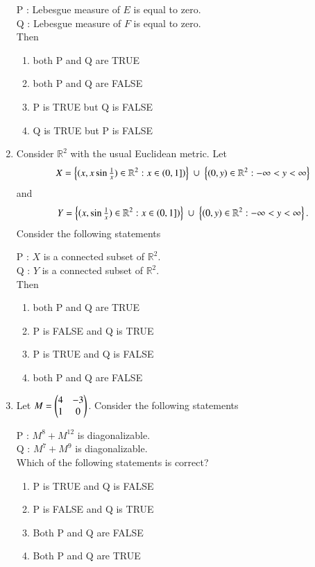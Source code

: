 \documentclass[journal,12pt,onecolumn]{IEEEtran}
\theoremstyle{remark}
\begin{document}
\begin{enumerate}[start=1, label=Q.\arabic*]
P : Lebesgue measure of $E$ is equal to zero.\\
Q : Lebesgue measure of $F$ is equal to zero.\\

Then
\begin{enumerate}
\item both P and Q are TRUE
\item both P and Q are FALSE
\item P is TRUE but Q is FALSE
\item Q is TRUE but P is FALSE
\end{enumerate}

\hfill{}

\item Consider $\mathbb{R}^{2}$ with the usual Euclidean metric. Let
\[
X=\left\{(x, x\sin \tfrac{1}{x}) \in \mathbb{R}^{2} : x \in \left(0,1]\right)\right\}\ \cup\ \left\{(0,y) \in \mathbb{R}^{2} : -\infty<y<\infty\right\}
\]
and
\[
Y=\left\{(x, \sin \tfrac{1}{x}) \in \mathbb{R}^{2} : x \in \left(0,1]\right)\right\}\ \cup\ \left\{(0,y) \in \mathbb{R}^{2} : -\infty<y<\infty\right\}.
\]
Consider the following statements\brak{:}

P : $X$ is a connected subset of $\mathbb{R}^{2}$.\\
Q : $Y$ is a connected subset of $\mathbb{R}^{2}$.\\

Then
\begin{enumerate}
\item both P and Q are TRUE
\item P is FALSE and Q is TRUE
\item P is TRUE and Q is FALSE
\item both P and Q are FALSE
\end{enumerate}

\hfill{}


\item Let $M=\begin{pmatrix}4 & -3\\ 1 & 0\end{pmatrix}$. Consider the following statements\brak{:}

P : $M^{8}+M^{12}$ is diagonalizable.\\
Q : $M^{7}+M^{9}$ is diagonalizable.\\

Which of the following statements is correct?
\begin{enumerate}
\item P is TRUE and Q is FALSE
\item P is FALSE and Q is TRUE
\item Both P and Q are FALSE
\item Both P and Q are TRUE
\end{enumerate}


\end{enumerate}
\end{document}
